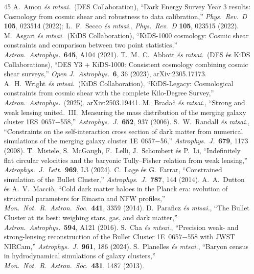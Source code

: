 \documentclass[11pt,a4paper]{article}
\begin{document}
\begin{thebibliography}{45}
 A.~Amon \textit{és mtsai.}\ (DES Collaboration), ``Dark Energy Survey Year 3 results: Cosmology from cosmic shear and robustness to data calibration,'' \textit{Phys.\ Rev.\ D} \textbf{105}, 023514 (2022); L.~F.~Secco \textit{és mtsai.}, \textit{Phys.\ Rev.\ D} \textbf{105}, 023515 (2022).
 M.~Asgari \textit{és mtsai.}\ (KiDS Collaboration), ``KiDS-1000 cosmology: Cosmic shear constraints and comparison between two point statistics,'' \textit{Astron.\ Astrophys.}\ \textbf{645}, A104 (2021).
 T.~M.~C.~Abbott \textit{és mtsai.}\ (DES és KiDS Collaborations), ``DES Y3 + KiDS-1000: Consistent cosmology combining cosmic shear surveys,'' \textit{Open J.\ Astrophys.}\ \textbf{6}, 36 (2023), arXiv:2305.17173.
 A.~H.~Wright \textit{és mtsai.}\ (KiDS Collaboration), ``KiDS-Legacy: Cosmological constraints from cosmic shear with the complete Kilo-Degree Survey,'' \textit{Astron.\ Astrophys.}\ (2025), arXiv:2503.19441.
 M.~Brada\v{c} \textit{és mtsai.}, ``Strong and weak lensing united.\ III.\ Measuring the mass distribution of the merging galaxy cluster 1ES~0657$-$558,'' \textit{Astrophys.\ J.}\ \textbf{652}, 937 (2006).
 S.~W.~Randall \textit{és mtsai.}, ``Constraints on the self-interaction cross section of dark matter from numerical simulations of the merging galaxy cluster 1E~0657$-$56,'' \textit{Astrophys.\ J.}\ \textbf{679}, 1173 (2008).
 T.~Mistele, S.~McGaugh, F.~Lelli, J.~Schombert és P.~Li, ``Indefinitely flat circular velocities and the baryonic Tully--Fisher relation from weak lensing,'' \textit{Astrophys.\ J.\ Lett.}\ \textbf{969}, L3 (2024).
 C.~Lage és G.~Farrar, ``Constrained simulation of the Bullet Cluster,'' \textit{Astrophys.\ J.}\ \textbf{787}, 144 (2014).
 A.~A.~Dutton és A.~V.~Macci\`o, ``Cold dark matter haloes in the Planck era: evolution of structural parameters for Einasto and NFW profiles,'' \textit{Mon.\ Not.\ R.\ Astron.\ Soc.}\ \textbf{441}, 3359 (2014).
 D.~Paraficz \textit{és mtsai.}, ``The Bullet Cluster at its best: weighing stars, gas, and dark matter,'' \textit{Astron.\ Astrophys.}\ \textbf{594}, A121 (2016).
 S.~Cha \textit{és mtsai.}, ``Precision weak- and strong-lensing reconstruction of the Bullet Cluster 1E~0657$-$558 with JWST NIRCam,'' \textit{Astrophys.\ J.}\ \textbf{961}, 186 (2024).
 S.~Planelles \textit{és mtsai.}, ``Baryon census in hydrodynamical simulations of galaxy clusters,'' \textit{Mon.\ Not.\ R.\ Astron.\ Soc.}\ \textbf{431}, 1487 (2013).

\end{thebibliography}
\end{document}
